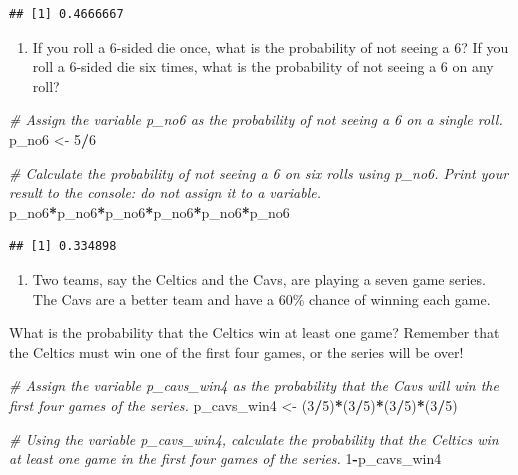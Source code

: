 \documentclass[
]{article}
\newenvironment{Shaded}{\begin{snugshade}}{\end{snugshade}}
\newcommand{\CommentTok}[1]{\textcolor[rgb]{0.56,0.35,0.01}{\textit{#1}}}
\newcommand{\DecValTok}[1]{\textcolor[rgb]{0.00,0.00,0.81}{#1}}
\newcommand{\NormalTok}[1]{#1}
\newcommand{\OperatorTok}[1]{\textcolor[rgb]{0.81,0.36,0.00}{\textbf{#1}}}
\newcommand{\StringTok}[1]{\textcolor[rgb]{0.31,0.60,0.02}{#1}}
\providecommand{\tightlist}{%
  \setlength{\itemsep}{0pt}\setlength{\parskip}{0pt}}
\begin{document}
\begin{verbatim}
## [1] 0.4666667
\end{verbatim}

\begin{enumerate}
\def\labelenumi{\arabic{enumi}.}
\setcounter{enumi}{2}
\tightlist
\item
  If you roll a 6-sided die once, what is the probability of not seeing
  a 6? If you roll a 6-sided die six times, what is the probability of
  not seeing a 6 on any roll?
\end{enumerate}

\begin{Shaded}
\begin{Highlighting}[]
\CommentTok{\# Assign the variable \textquotesingle{}p\_no6\textquotesingle{} as the probability of not seeing a 6 on a single roll.}
\NormalTok{p\_no6 \textless{}{-}}\StringTok{ }\DecValTok{5}\OperatorTok{/}\DecValTok{6}

\CommentTok{\# Calculate the probability of not seeing a 6 on six rolls using \textasciigrave{}p\_no6\textasciigrave{}. Print your result to the console: do not assign it to a variable.}
\NormalTok{p\_no6}\OperatorTok{*}\NormalTok{p\_no6}\OperatorTok{*}\NormalTok{p\_no6}\OperatorTok{*}\NormalTok{p\_no6}\OperatorTok{*}\NormalTok{p\_no6}\OperatorTok{*}\NormalTok{p\_no6}
\end{Highlighting}
\end{Shaded}

\begin{verbatim}
## [1] 0.334898
\end{verbatim}

\begin{enumerate}
\def\labelenumi{\arabic{enumi}.}
\setcounter{enumi}{3}
\tightlist
\item
  Two teams, say the Celtics and the Cavs, are playing a seven game
  series. The Cavs are a better team and have a 60\% chance of winning
  each game.
\end{enumerate}

What is the probability that the Celtics win at least one game? Remember
that the Celtics must win one of the first four games, or the series
will be over!

\begin{Shaded}
\begin{Highlighting}[]
\CommentTok{\# Assign the variable \textasciigrave{}p\_cavs\_win4\textasciigrave{} as the probability that the Cavs will win the first four games of the series.}
\NormalTok{p\_cavs\_win4 \textless{}{-}}\StringTok{ }\NormalTok{(}\DecValTok{3}\OperatorTok{/}\DecValTok{5}\NormalTok{)}\OperatorTok{*}\NormalTok{(}\DecValTok{3}\OperatorTok{/}\DecValTok{5}\NormalTok{)}\OperatorTok{*}\NormalTok{(}\DecValTok{3}\OperatorTok{/}\DecValTok{5}\NormalTok{)}\OperatorTok{*}\NormalTok{(}\DecValTok{3}\OperatorTok{/}\DecValTok{5}\NormalTok{)}

\CommentTok{\# Using the variable \textasciigrave{}p\_cavs\_win4\textasciigrave{}, calculate the probability that the Celtics win at least one game in the first four games of the series.}
\DecValTok{1}\OperatorTok{{-}}\NormalTok{p\_cavs\_win4}
\end{Highlighting}
\end{Shaded}
\end{document}
